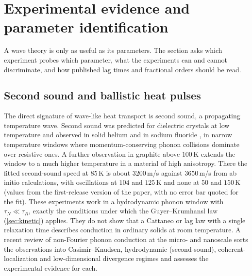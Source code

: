 \section{Experimental evidence and parameter identification}\label{sec:experiments}

A wave theory is only as useful as its parameters. The section asks which experiment probes which parameter, what the experiments can and cannot discriminate, and how published lag times and fractional orders should be read.

\subsection{Second sound and ballistic heat pulses}
The direct signature of wave-like heat transport is second sound, a propagating temperature wave. Second sound was predicted for dielectric crystals at low temperature \citep{Chester1963,GuyerKrumhansl1966} and observed in solid helium \citep{Ackerman1966} and in sodium fluoride \citep{McNelly1970,Jackson1970}, in narrow temperature windows where momentum-conserving phonon collisions dominate over resistive ones. A further observation in graphite above $100$\,K \citep{Huberman2019} extends the window to a much higher temperature in a material of high anisotropy. There the fitted second-sound speed at $85$\,K is about $3200$\,m/s against $3650$\,m/s from ab initio calculations, with oscillations at $104$ and $125$\,K and none at $50$ and $150$\,K (values from the first-release version of the paper, with no error bar quoted for the fit). These experiments work in a hydrodynamic phonon window with $\tau_N\ll\tau_R$, exactly the conditions under which the Guyer--Krumhansl law (\cref{sec:kinetic}) applies. They do not show that a Cattaneo or lag law with a single relaxation time describes conduction in ordinary solids at room temperature. A recent review of non-Fourier phonon conduction at the micro- and nanoscale \citep{Chen2021NRP} sorts the observations into Casimir--Knudsen, hydrodynamic (second-sound), coherent-localization and low-dimensional divergence regimes and assesses the experimental evidence for each.

